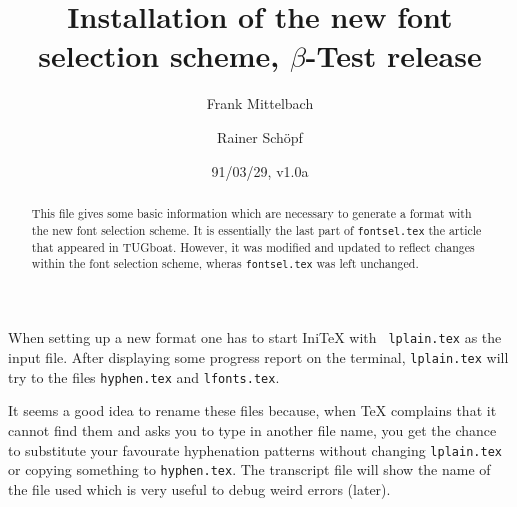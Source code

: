 

\def\fileversion{v1.0a}
\def\filedate{91/03/29}



 \title{Installation of the new font selection scheme, 
        $\beta$-Test release}

 \author{Frank Mittelbach \and
         Rainer Sch\"opf}

\date{\filedate, \fileversion}


\newcommand{\AmS}{{\the\textfont2 A}\kern-.1667em\lower.5ex\hbox
        {\the\textfont2 M}\kern-.125em{\the\textfont2 S}}
\newcommand{\AmSTeX}{\AmS-\TeX}
\newcommand{\AmSLaTeX}{\AmS-\LaTeX}
\newcommand{\meta}[1]{$\langle${\it#1\/$\rangle$}}




\maketitle
\begin{abstract}
  This file gives some basic information which are necessary to
  generate a format with the new font selection scheme. It is
  essentially the last part of {\tt fontsel.tex} the article that
  appeared in TUGboat. However, it was modified and updated to reflect
  changes within the font selection scheme, wheras {\tt fontsel.tex}
  was left unchanged.
\end{abstract}

 When setting up a new format one has to start Ini\TeX{} with {\tt
 lplain.tex} as the input file. After displaying some progress report
 on the terminal, {\tt lplain.tex} will try to \verb++ the files
 {\tt hyphen.tex} and {\tt lfonts.tex}.

 It seems a good idea to rename these files because, when \TeX{}
 complains that it cannot find them and asks you to type in another
 file name, you get the chance to substitute your favourate
 hyphenation patterns without changing {\tt lplain.tex} or copying
 something to {\tt hyphen.tex}.  The transcript file will show the
 name of the file used which is very useful to debug weird errors
 (later).

